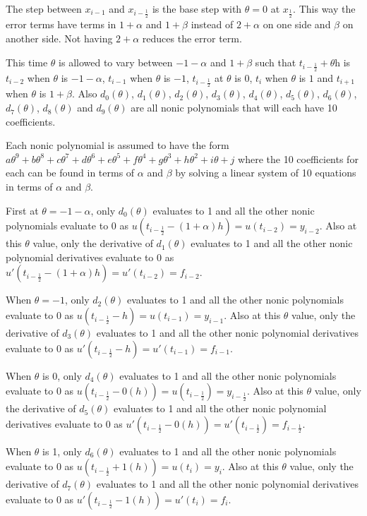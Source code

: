 The step between $x_{i-1}$ and $x_{i-\frac{1}{2}}$ is the base step with $\theta=0$ at $x_\frac{1}{2}$. This way the error terms have terms in $1 + \alpha$ and $1 + \beta$ instead of $2 + \alpha$ on one side and $\beta$ on another side. Not having $2 + \alpha$ reduces the error term. 

This time $\theta$ is allowed to vary between $-1-\alpha$ and $1+\beta$ such that $t_{i-\frac{1}{2}} + \theta$h is $t_{i-2}$ when $\theta$ is $-1-\alpha$, $t_{i-1}$ when $\theta$ is $-1$, $t_{i-\frac{1}{2}}$ at $\theta$ is 0, $t_i$ when $\theta$ is $1$ and $t_{i + 1}$ when $\theta$ is $1+\beta$. Also $d_0(\theta)$, $d_1(\theta)$, $d_2(\theta)$, $d_3(\theta)$, $d_4(\theta)$, $d_5(\theta)$, $d_6(\theta)$, $d_7(\theta)$, $d_8(\theta)$ and $d_9(\theta)$ are all nonic polynomials that will each have 10 coefficients.

Each nonic polynomial is assumed to have the form $a\theta^9 + b\theta^8 + c\theta^7 + d\theta^6 + e\theta^5 + f\theta^4 + g\theta^3 + h\theta^2 + i\theta + j$ where the 10 coefficients for each can be found in terms of $\alpha$ and $\beta$ by solving a linear system of 10 equations in terms of $\alpha$ and $\beta$. 


First at $\theta = -1-\alpha$, only $d_0(\theta)$ evaluates to 1 and all the other nonic polynomials evaluate to 0 as $u(t_{i-\frac{1}{2}} - (1+\alpha) h) = u(t_{i - 2}) = y_{i - 2}$.  Also at this $\theta$ value, only the derivative of $d_1(\theta)$ evaluates to 1 and all the other nonic polynomial derivatives evaluate to 0 as $u'(t_{i-\frac{1}{2}} - (1+\alpha) h) = u'(t_{i - 2}) = f_{i - 2}$. 

When $\theta = -1$, only $d_2(\theta)$ evaluates to 1 and all the other nonic polynomials evaluate to 0 as $u(t_{i-\frac{1}{2}} - h) = u(t_{i - 1}) = y_{i - 1}$. Also at this $\theta$ value, only the derivative of $d_3(\theta)$ evaluates to 1 and all the other nonic polynomial derivatives evaluate to 0 as $u'(t_{i-\frac{1}{2}} - h) = u'(t_{i - 1}) = f_{i - 1}$. 

When $\theta$ is 0, only $d_4(\theta)$ evaluates to 1 and all the other nonic polynomials evaluate to 0 as $u(t_{i-\frac{1}{2}} - 0(h)) = u(t_{i-\frac{1}{2}}) = y_{i-\frac{1}{2}}$. Also at this $\theta$ value, only the derivative of $d_5(\theta)$ evaluates to 1 and all the other nonic polynomial derivatives evaluate to 0 as $u'(t_{i-\frac{1}{2}} - 0(h)) = u'(t_{i-\frac{1}{2}}) = f_{i-\frac{1}{2}}$. 

When $\theta$ is 1, only $d_6(\theta)$ evaluates to 1 and all the other nonic polynomials evaluate to 0 as $u(t_{i-\frac{1}{2}} + 1(h)) = u(t_{i}) = y_{i}$. Also at this $\theta$ value, only the derivative of $d_7(\theta)$ evaluates to 1 and all the other nonic polynomial derivatives evaluate to 0 as $u'(t_{i-\frac{1}{2}} - 1(h)) = u'(t_{i}) = f_{i}$. 

